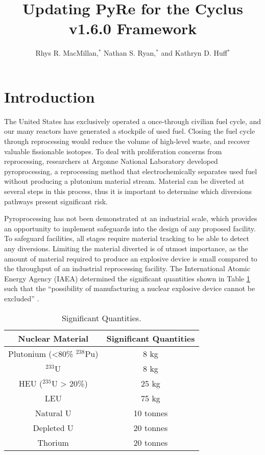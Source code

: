 \documentclass{anstrans}
\title{Updating PyRe for the Cyclus v1.6.0 Framework}
\author{Rhys R. MacMillan,$^{*}$ Nathan S. Ryan,$^{*}$ and Kathryn D. Huff$^{*}$}
\institute{
$^{*}$Advanced Reactors and Fuel Cycles Group, University of Illinois, Urbana IL, rhysrm2@illinois.edu
}
\begin{document}
\section{Introduction}
The United States has exclusively operated a once-through civilian fuel cycle, and our many reactors have generated a stockpile of used fuel. Closing the fuel cycle through reprocessing would reduce the volume of high-level waste, and recover valuable fissionable isotopes. To deal with proliferation concerns from reprocessing, researchers at Argonne National Laboratory developed pyroprocessing, a reprocessing method that electrochemically separates used fuel without producing a plutonium material stream. Material can be diverted at several steps in this process, thus it is important to determine which diversions pathways present significant risk.

Pyroprocessing has not been demonstrated at an industrial scale, which provides an opportunity to implement safeguards into the design of any proposed facility. To safeguard facilities, all stages require material tracking to be able to detect any diversions. Limiting the material diverted is of utmost importance, as the amount of material required to produce an explosive device is small compared to the throughput of an industrial reprocessing facility. The International Atomic Energy Agency (IAEA) determined the significant quantities shown in Table \ref{tab:sig_quant} such that the “possibility of manufacturing a nuclear explosive device cannot be excluded” \cite{schanfein_iaea_2021}.

\begin{table}[H]
  \centering
  \caption{Significant Quantities.}
  \label{tab:sig_quant}
  \begin{tabular}{c c}
    \hline
    Nuclear Material&Significant Quantities\\
    \hline
    Plutonium (<80\% $^{238}$Pu)&8 kg\\
    $^{233}$U&8 kg\\
    HEU ($^{235}$U > 20\%)&25 kg\\
    LEU&75 kg\\
    Natural U&10 tonnes\\
    Depleted U&20 tonnes\\
    Thorium&20 tonnes\\
    \hline
  \end{tabular}
\end{table}
\end{document}
